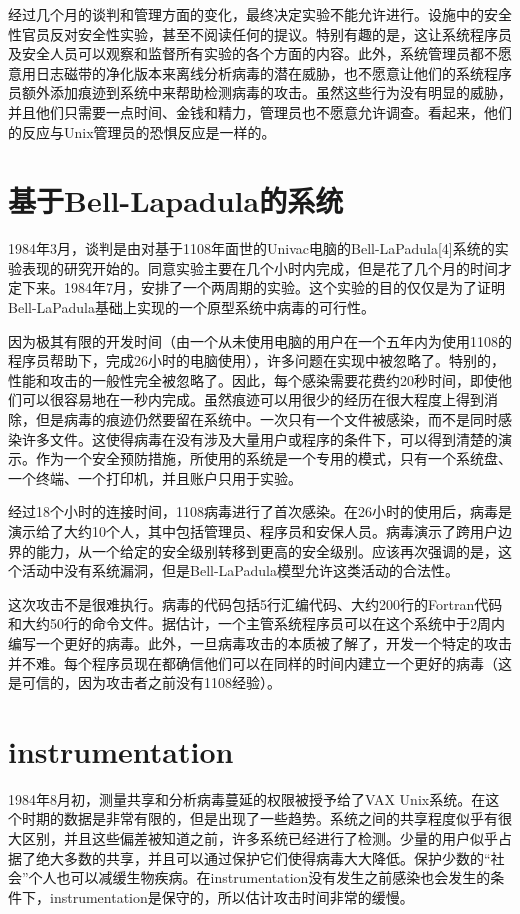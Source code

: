 经过几个月的谈判和管理方面的变化，最终决定实验不能允许进行。设施中的安全性官员反对安全性实验，甚至不阅读任何的提议。特别有趣的是，这让系统程序员及安全人员可以观察和监督所有实验的各个方面的内容。此外，系统管理员都不愿意用日志磁带的净化版本来离线分析病毒的潜在威胁，也不愿意让他们的系统程序员额外添加痕迹到系统中来帮助检测病毒的攻击。虽然这些行为没有明显的威胁，并且他们只需要一点时间、金钱和精力，管理员也不愿意允许调查。看起来，他们的反应与Unix管理员的恐惧反应是一样的。


\section{基于Bell-Lapadula的系统}

1984年3月，谈判是由对基于1108年面世的Univac电脑的Bell-LaPadula[4]系统的实验表现的研究开始的。同意实验主要在几个小时内完成，但是花了几个月的时间才定下来。1984年7月，安排了一个两周期的实验。这个实验的目的仅仅是为了证明Bell-LaPadula基础上实现的一个原型系统中病毒的可行性。

因为极其有限的开发时间（由一个从未使用电脑的用户在一个五年内为使用1108的程序员帮助下，完成26小时的电脑使用），许多问题在实现中被忽略了。特别的，性能和攻击的一般性完全被忽略了。因此，每个感染需要花费约20秒时间，即使他们可以很容易地在一秒内完成。虽然痕迹可以用很少的经历在很大程度上得到消除，但是病毒的痕迹仍然要留在系统中。一次只有一个文件被感染，而不是同时感染许多文件。这使得病毒在没有涉及大量用户或程序的条件下，可以得到清楚的演示。作为一个安全预防措施，所使用的系统是一个专用的模式，只有一个系统盘、一个终端、一个打印机，并且账户只用于实验。


经过18个小时的连接时间，1108病毒进行了首次感染。在26小时的使用后，病毒是演示给了大约10个人，其中包括管理员、程序员和安保人员。病毒演示了跨用户边界的能力，从一个给定的安全级别转移到更高的安全级别。应该再次强调的是，这个活动中没有系统漏洞，但是Bell-LaPadula模型允许这类活动的合法性。


这次攻击不是很难执行。病毒的代码包括5行汇编代码、大约200行的Fortran代码和大约50行的命令文件。据估计，一个主管系统程序员可以在这个系统中于2周内编写一个更好的病毒。此外，一旦病毒攻击的本质被了解了，开发一个特定的攻击并不难。每个程序员现在都确信他们可以在同样的时间内建立一个更好的病毒（这是可信的，因为攻击者之前没有1108经验）。

\section{instrumentation}

1984年8月初，测量共享和分析病毒蔓延的权限被授予给了VAX Unix系统。在这个时期的数据是非常有限的，但是出现了一些趋势。系统之间的共享程度似乎有很大区别，并且这些偏差被知道之前，许多系统已经进行了检测。少量的用户似乎占据了绝大多数的共享，并且可以通过保护它们使得病毒大大降低。保护少数的“社会”个人也可以减缓生物疾病。在instrumentation没有发生之前感染也会发生的条件下，instrumentation是保守的，所以估计攻击时间非常的缓慢。



